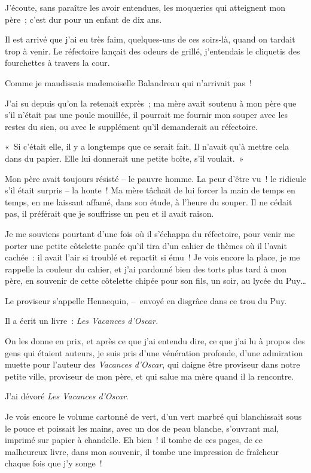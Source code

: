 \documentclass[french,twoside]{book} %
\begin{document}
J’écoute, sans paraître les avoir entendues, les moqueries qui atteignent mon père ; c’est dur pour un enfant de dix ans.\par
Il est arrivé que j’ai eu très faim, quelques-uns de ces soirs-là, quand on tardait trop à venir. Le réfectoire lançait des odeurs de grillé, j’entendais le cliquetis des fourchettes à travers la cour.\par
Comme je maudissais mademoiselle Balandreau qui n’arrivait pas !\par
J’ai su depuis qu’on la retenait exprès ; ma mère avait soutenu à mon père que s’il n’était pas une poule mouillée, il pourrait me fournir mon souper avec les restes du sien, ou avec le supplément qu’il demanderait au réfectoire.\par
« Si c’était elle, il y a longtemps que ce serait fait. Il n’avait qu’à mettre cela dans du papier. Elle lui donnerait une petite boîte, s’il voulait. »\par
Mon père avait toujours résisté – le pauvre homme. La peur d’être vu ! le ridicule s’il était surpris – la honte ! Ma mère tâchait de lui forcer la main de temps en temps, en me laissant affamé, dans son étude, à l’heure du souper. Il ne cédait pas, il préférait que je souffrisse un peu et il avait raison.\par
Je me souviens pourtant d’une fois où il s’échappa du réfectoire, pour venir me porter une petite côtelette panée qu’il tira d’un cahier de thèmes où il l’avait cachée : il avait l’air si troublé et repartit si ému ! Je vois encore la place, je me rappelle la couleur du cahier, et j’ai pardonné bien des torts plus tard à mon père, en souvenir de cette côtelette chipée pour son fils, un soir, au lycée du Puy…\par
\bigbreak
\noindent Le proviseur s’appelle Hennequin, – envoyé en disgrâce dans ce trou du Puy.\par
Il a écrit un livre : \emph{Les Vacances d’Oscar.}\par
On les donne en prix, et après ce que j’ai entendu dire, ce que j’ai lu à propos des gens qui étaient auteurs, je suis pris d’une vénération profonde, d’une admiration muette pour l’auteur des \emph{Vacances d’Oscar}, qui daigne être proviseur dans notre petite ville, proviseur de mon père, et qui salue ma mère quand il la rencontre.\par
J’ai dévoré \emph{Les Vacances d’Oscar}.\par
Je vois encore le volume cartonné de vert, d’un vert marbré qui blanchissait sous le pouce et poissait les mains, avec un dos de peau blanche, s’ouvrant mal, imprimé sur papier à chandelle. Eh bien ! il tombe de ces pages, de ce malheureux livre, dans mon souvenir, il tombe une impression de fraîcheur chaque fois que j’y songe !\par
\end{document}
